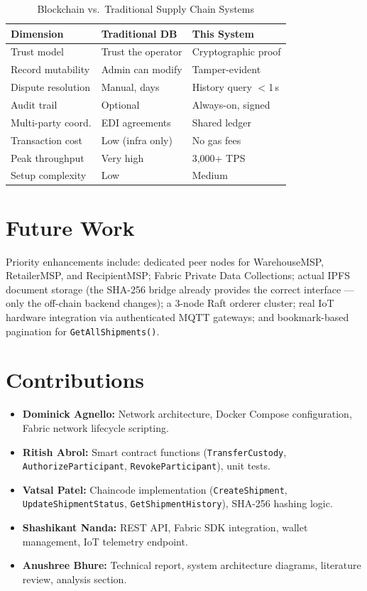 \documentclass[conference]{IEEEtran}
\begin{document}
\begin{table}[h]
\caption{Blockchain vs.\ Traditional Supply Chain Systems}
\label{tab:comparison}
\centering
\renewcommand{\arraystretch}{1.1}
\begin{tabular}{@{}lll@{}}
\toprule
\textbf{Dimension} & \textbf{Traditional DB} & \textbf{This System} \\
\midrule
Trust model         & Trust the operator  & Cryptographic proof \\
Record mutability   & Admin can modify    & Tamper-evident \\
Dispute resolution  & Manual, days        & History query $<$1\,s \\
Audit trail         & Optional            & Always-on, signed \\
Multi-party coord.  & EDI agreements      & Shared ledger \\
Transaction cost    & Low (infra only)    & No gas fees \\
Peak throughput     & Very high           & 3{,}000+ TPS \\
Setup complexity    & Low                 & Medium \\
\bottomrule
\end{tabular}
\end{table}

\section{Future Work}

Priority enhancements include: dedicated peer nodes for WarehouseMSP,
RetailerMSP, and RecipientMSP; Fabric Private Data Collections; actual IPFS
document storage (the SHA-256 bridge already provides the correct interface
--- only the off-chain backend changes); a 3-node Raft orderer cluster; real
IoT hardware integration via authenticated MQTT gateways; and
bookmark-based pagination for \texttt{GetAllShipments()}.

\section{Contributions}

\begin{itemize}
  \item \textbf{Dominick Agnello:} Network architecture, Docker Compose
    configuration, Fabric network lifecycle scripting.
  \item \textbf{Ritish Abrol:} Smart contract functions
    (\texttt{TransferCustody}, \texttt{AuthorizeParticipant},
    \texttt{RevokeParticipant}), unit tests.
  \item \textbf{Vatsal Patel:} Chaincode implementation
    (\texttt{CreateShipment}, \texttt{UpdateShipmentStatus},
    \texttt{GetShipmentHistory}), SHA-256 hashing logic.
  \item \textbf{Shashikant Nanda:} REST API, Fabric SDK integration, wallet
    management, IoT telemetry endpoint.
  \item \textbf{Anushree Bhure:} Technical report, system architecture
    diagrams, literature review, analysis section.
\end{itemize}
\end{document}
